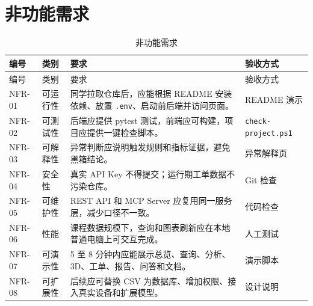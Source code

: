\documentclass[12pt,a4paper]{ctexart}
\newcommand{\code}[1]{{\footnotesize\nolinkurl{#1}}}
\begin{document}
\section{非功能需求}
\begin{longtable}{p{2cm}p{3.4cm}p{6.5cm}p{2.6cm}}
\caption{非功能需求}\\
\toprule
编号 & 类别 & 要求 & 验收方式 \\
\midrule
\endfirsthead
\toprule
编号 & 类别 & 要求 & 验收方式 \\
\midrule
\endhead
NFR-01 & 可运行性 & 同学拉取仓库后，应能根据 README 安装依赖、放置 \code{.env}、启动前后端并访问页面。 & README 演示 \\
NFR-02 & 可测试性 & 后端应提供 pytest 测试，前端应可构建，项目应提供一键检查脚本。 & \code{check-project.ps1} \\
NFR-03 & 可解释性 & 异常判断应说明触发规则和指标证据，避免黑箱结论。 & 异常解释页 \\
NFR-04 & 安全性 & 真实 API Key 不得提交；运行期工单数据不污染仓库。 & Git 检查 \\
NFR-05 & 可维护性 & REST API 和 MCP Server 应复用同一服务层，减少口径不一致。 & 代码检查 \\
NFR-06 & 性能 & 课程数据规模下，查询和图表刷新应在本地普通电脑上可交互完成。 & 人工测试 \\
NFR-07 & 可演示性 & 5 至 8 分钟内应能展示总览、查询、分析、3D、工单、报告、问答和文档。 & 演示脚本 \\
NFR-08 & 可扩展性 & 后续应可替换 CSV 为数据库、增加权限、接入真实设备和扩展模型。 & 设计说明 \\
\bottomrule
\end{longtable}
\end{document}
